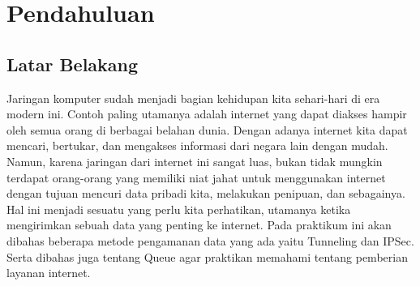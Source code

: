 \section{Pendahuluan}
\subsection{Latar Belakang}
Jaringan komputer sudah menjadi bagian kehidupan kita sehari-hari di era modern ini. Contoh paling utamanya adalah internet yang dapat diakses hampir oleh semua orang di berbagai belahan dunia. Dengan adanya internet kita dapat mencari, bertukar, dan mengakses informasi dari negara lain dengan mudah. Namun, karena jaringan dari internet ini sangat luas, bukan tidak mungkin terdapat orang-orang yang memiliki niat jahat untuk menggunakan internet dengan tujuan mencuri data pribadi kita, melakukan penipuan, dan sebagainya. Hal ini menjadi sesuatu yang perlu kita perhatikan, utamanya ketika mengirimkan sebuah data yang penting ke internet. Pada praktikum ini akan dibahas beberapa metode pengamanan data yang ada yaitu Tunneling dan IPSec. Serta dibahas juga tentang Queue agar praktikan memahami tentang pemberian layanan internet.

